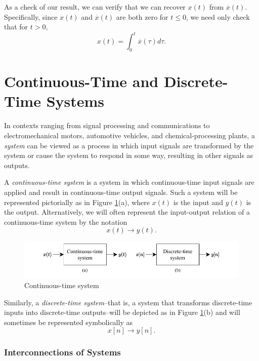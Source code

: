 \documentclass[a4paper,twoside]{book}
\begin{document}
As a check of our result, we can verify that we can recover $x(t)$ from $\overset{\cdot}{x}(t)$. Specifically, since $x(t)$ and $\overset{\cdot}{x}(t)$ are both zero for $t\le 0$, we need only check that for $t>0$,
\begin{equation}
    x(t)=\int_0^t\overset{\cdot}{x}(\tau)d\tau.
    \label{1.77}
\end{equation}

\section{Continuous-Time and Discrete-Time Systems}

In contexts ranging from signal processing and communications to electromechanical motors, automotive vehicles, and chemical-processing plants, a \textit{system} can be viewed as a process in which input signals are transformed by the system or cause the system to respond in some way, resulting in other signals as outputs.

A \textit{continuous-time system} is a system in which continuous-time input signals are applied and result in continuous-time output signals. Such a system will be represented pictorially as in Figure \ref{Fig2}(a), where $x(t)$ is the input and $y(t)$ is the output. Alternatively, we will often represent the input-output relation of a continuous-time system by the notation
\begin{equation}
    x(t)\to y(t).
    \label{1.78}
\end{equation}

\begin{figure}[htbp]
    \centering
    \includegraphics[width=\linewidth]{Fig2.pdf}
    \caption{Continuous-time system}
    \label{Fig2}
\end{figure}

Similarly, a \textit{discrete-time system}--that is, a system that transforms discrete-time inputs into discrete-time outputs--will be depicted as in Figure \ref{Fig2}(b) and will sometimes be represented symbolically as
\begin{equation}
    x[n]\to y[n].
    \label{1.79}
\end{equation}

\subsubsection{Interconnections of Systems}
\end{document}
